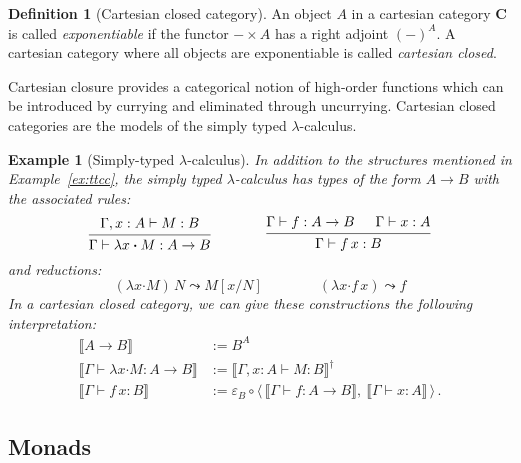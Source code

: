 \documentclass[11pt,oneside]{book}
\newtheorem{example}[theorem]{Example}
\theoremstyle{definition}
\newtheorem{definition}[theorem]{Definition}
\newcommand{\bdot}{\boldsymbol{\cdot}}
\begin{document}
\begin{definition}[Cartesian closed category] \label{def:cc} %
An object $A$ in a cartesian category $\mathbf{C}$
is called \emph{exponentiable}
if the functor ${-} \times A$ has a right adjoint $(-)^A$.
A cartesian category
where all objects are exponentiable
is called \emph{cartesian closed}.
\end{definition}

Cartesian closure provides
a categorical notion of high-order functions
which can be introduced by currying
and eliminated through uncurrying.
Cartesian closed categories are the models
of the simply typed $\lambda$-calculus.

\begin{example}[Simply-typed $\lambda$-calculus] %
In addition to the structures mentioned in Example~\ref{ex:ttcc},
the simply typed $\lambda$-calculus has types of the form
$A \rightarrow B$ with the associated rules:
\[
  \begin{prooftree}
    \hypo{\Gamma, x:A \vdash M : B}
    \infer1{\Gamma \vdash \lambda x \bdot M : A \rightarrow B}
  \end{prooftree}
  \qquad \qquad
  \begin{prooftree}
    \hypo{\Gamma \vdash f : A \rightarrow B}
    \hypo{\Gamma \vdash x : A}
    \infer2{\Gamma \vdash f \, x : B}
  \end{prooftree}
\]
and reductions:
\[
  (\lambda x \bdot M) \, N \leadsto M[x/N]
  \qquad \qquad
  (\lambda x \bdot f \, x) \leadsto f
\]
In a cartesian closed category,
we can give these constructions the following interpretation:
\begin{align*}
  \llbracket A \rightarrow B \rrbracket &:= B^A \\
  \llbracket \Gamma \vdash \lambda x \bdot M : A \rightarrow B \rrbracket
    &:= \llbracket \Gamma, x:A \vdash M : B \rrbracket^\dagger \\
  \llbracket \Gamma \vdash f \, x : B \rrbracket &:=
    \varepsilon_B \circ
    \langle \,
      \llbracket \Gamma \vdash f : A \rightarrow B \rrbracket , \:
      \llbracket \Gamma \vdash x : A \rrbracket
    \, \rangle
  \,.
\end{align*}
\end{example}


\subsection{Monads} \label{sec:freemon} %
\end{document}

